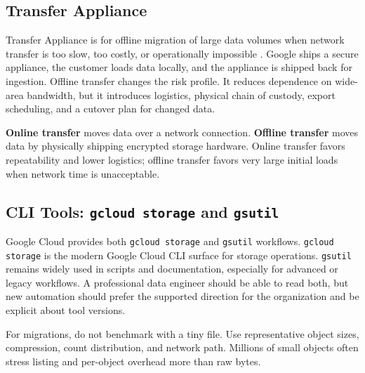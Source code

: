 \subsection{Transfer Appliance}
Transfer Appliance is for offline migration of large data volumes when network transfer is too slow, too costly, or operationally impossible \cite{googlecloudtransferappliance}. Google ships a secure appliance, the customer loads data locally, and the appliance is shipped back for ingestion. Offline transfer changes the risk profile. It reduces dependence on wide-area bandwidth, but it introduces logistics, physical chain of custody, export scheduling, and a cutover plan for changed data.

\begin{definitionbox}
\textbf{Online transfer} moves data over a network connection. \textbf{Offline transfer} moves data by physically shipping encrypted storage hardware. Online transfer favors repeatability and lower logistics; offline transfer favors very large initial loads when network time is unacceptable.
\end{definitionbox}

\subsection{CLI Tools: \texttt{gcloud storage} and \texttt{gsutil}}
Google Cloud provides both \texttt{gcloud storage} and \texttt{gsutil} workflows. \texttt{gcloud storage} is the modern Google Cloud CLI surface for storage operations. \texttt{gsutil} remains widely used in scripts and documentation, especially for advanced or legacy workflows. A professional data engineer should be able to read both, but new automation should prefer the supported direction for the organization and be explicit about tool versions.

\begin{tipbox}
For migrations, do not benchmark with a tiny file. Use representative object sizes, compression, count distribution, and network path. Millions of small objects often stress listing and per-object overhead more than raw bytes.
\end{tipbox}

